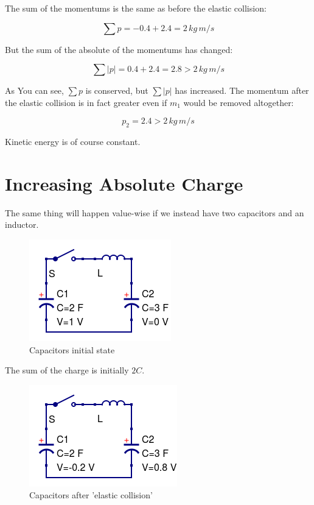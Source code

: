 \documentclass[]{../common/elementary-physics}
\begin{document}
The sum of the momentums is the same as before the elastic collision:

\begin{equation}
\sum p = -0.4 + 2.4 = 2 \, kg \, m/s
\end{equation}

But the sum of the absolute of the momentums has changed:

\begin{equation}
\sum | p | = 0.4 + 2.4 = 2.8 > 2 \, kg \, m/s
\end{equation}

As You can see, $\sum p$ is conserved, but $\sum | p |$ has increased.
The momentum after the elastic collision is in fact greater even if $m_1$ would be removed altogether:

\begin{equation}
p_2 = 2.4 > 2 \, kg \, m/s
\end{equation}

Kinetic energy is of course constant.
 
\section{Increasing Absolute Charge}

The same thing will happen value-wise if we instead have two capacitors and an inductor.

\begin{figure}[ht] \centering
	\includegraphics[scale=.5]{ccl7} \caption{Capacitors initial state}
\end{figure}

The sum of the charge is initially $2 C$.

\begin{figure}[ht] \centering
	\includegraphics[scale=.5]{ccl8} \caption{Capacitors after 'elastic collision'}
\end{figure}
\end{document}

